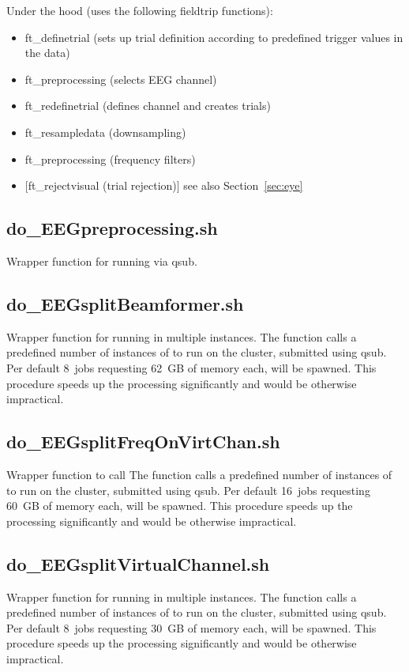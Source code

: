 \documentclass[12pt,a4paper]{scrartcl}
\begin{document}
\noindent Under the hood (uses the following fieldtrip functions):
\begin{itemize}
\item ft\_definetrial (sets up trial definition according to predefined trigger values in the data)
\item ft\_preprocessing (selects EEG channel)
\item ft\_redefinetrial (defines channel and creates trials)
\item ft\_resampledata (downsampling)
\item ft\_preprocessing (frequency filters)
\item $[$ft\_rejectvisual (trial rejection)$]$ see also Section~\ref{sec:eye}
\end{itemize}

\subsection{do\_EEGpreprocessing.sh}
\label{sh:EEGpreproc}
Wrapper function for running \texttt{} via qsub.\\

\subsection{do\_EEGsplitBeamformer.sh}
\label{sh:splitbeamf}
Wrapper function for running \texttt{} in multiple instances. The function calls a predefined number of instances of \texttt{} to run on the cluster, submitted using qsub. Per default 8~jobs requesting 62~GB of memory each, will be spawned. This procedure speeds up the processing significantly and would be otherwise impractical.\\

\subsection{do\_EEGsplitFreqOnVirtChan.sh}
\label{sh:splitfreqVirt}
Wrapper function to call \texttt{} The function calls a predefined number of instances of \texttt{} to run on the cluster, submitted using qsub. Per default 16~jobs requesting 60~GB of memory each, will be spawned. This procedure speeds up the processing significantly and would be otherwise impractical.\\

\subsection{do\_EEGsplitVirtualChannel.sh}
\label{sh:splitvirtch}
Wrapper function for running \texttt{} in multiple instances. The function calls a predefined number of instances of \texttt{} to run on the cluster, submitted using qsub. Per default 8~jobs requesting 30~GB of memory each, will be spawned. This procedure speeds up the processing significantly and would be otherwise impractical.\\
\end{document}
